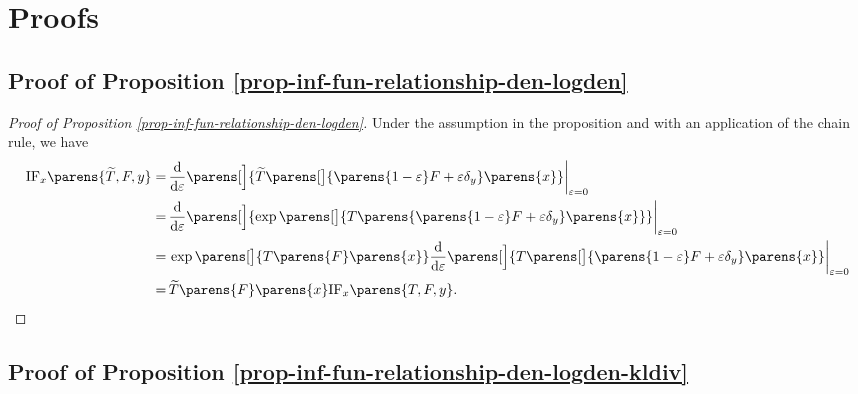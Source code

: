 \newpage

\section{Proofs}

\subsection{Proof of Proposition \ref{prop-inf-fun-relationship-den-logden}}\label{proof-prop-inf-fun-relationship-den-logden}

\begin{proof}[Proof of Proposition \ref{prop-inf-fun-relationship-den-logden}]
	Under the assumption in the proposition and with an application of the chain rule, we have 
	\begin{align*}
		\mathrm{IF}_x \parens{\widetilde{T}, F, y} = & \, \frac{\diff}{\diff \varepsilon} \parens[\Big]{\widetilde{T} \parens[\big]{\parens{1 - \varepsilon} F + \varepsilon \delta_y} \parens{x} } \bigg\vert_{\varepsilon = 0} \\ 
		= & \, \frac{\diff}{\diff \varepsilon} \parens[\Big]{\exp \parens[\big]{T \parens{\parens{1 - \varepsilon} F + \varepsilon \delta_y} \parens{x} }} \bigg\vert_{\varepsilon = 0} \\ 
		= & \, \exp \parens[\big]{T \parens{F} \parens{x} } \frac{\diff}{\diff \varepsilon} \parens[\Big]{T \parens[\big]{\parens{1 - \varepsilon} F + \varepsilon \delta_y} \parens{x} } \bigg\vert_{\varepsilon = 0} \\ 
		= & \, \widetilde{T} \parens{F} \parens{x} \mathrm{IF}_x \parens{T, F, y}. 
	\end{align*}
\end{proof}


\subsection{Proof of Proposition \ref{prop-inf-fun-relationship-den-logden-kldiv}}\label{proof-prop-inf-fun-relationship-den-logden-kldiv}

